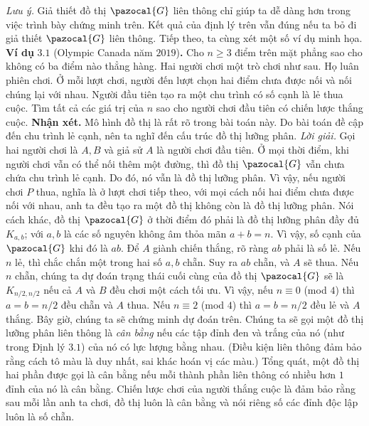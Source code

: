 \begin{multicols}{2}
	\vskip 0.1cm
	\textit{Lưu ý.} Giả thiết đồ thị $\pazocal{G}$ liên thông chỉ giúp ta dễ dàng hơn trong việc trình bày chứng minh trên. Kết quả của định lý trên vẫn đúng nếu ta bỏ đi giả thiết $\pazocal{G}$ liên thông. Tiếp theo, ta cùng xét một số ví dụ minh họa. 
	\vskip 0.1cm
	\textbf{\color{hoccungpi}Ví dụ} $\pmb{3.1}$ (Olympic Canada năm $2019$)\textbf{\color{hoccungpi}.} 
	Cho $n \geq 3$ điểm trên mặt phẳng sao cho không có ba điểm nào thẳng hàng. Hai người chơi một trò chơi như sau. Họ luân phiên chơi. Ở mỗi lượt chơi, người đến lượt chọn hai điểm chưa được nối và nối chúng lại với nhau. Người đầu tiên tạo ra một chu trình có số cạnh là lẻ thua cuộc. Tìm tất cả các giá trị của $n$ sao cho người chơi đầu tiên có chiến lược thắng cuộc.  
	\vskip 0.1cm
	\textbf{\color{hoccungpi}Nhận xét. } Mô hình đồ thị là rất rõ trong bài toán này. Do bài toán đề cập đến chu trình lẻ cạnh, nên ta nghĩ đến cấu trúc đồ thị lưỡng phân.  
	\vskip 0.1cm
	\textit{Lời giải.} Gọi hai người chơi là $A, B$ và giả sử $A$ là người chơi đầu tiên.
	\vskip 0.1cm
	Ở mọi thời điểm, khi người chơi vẫn có thể nối thêm một đường, thì đồ thị $\pazocal{G}$ vẫn chưa chứa chu trình lẻ cạnh. Do đó, nó vẫn là đồ thị lưỡng phân. Vì vậy, nếu người chơi $P$ thua, nghĩa là ở lượt chơi tiếp theo, với mọi cách nối hai điểm chưa được nối với nhau, anh ta đều tạo ra một đồ thị không còn là đồ thị lưỡng phân. Nói cách khác, đồ thị $\pazocal{G}$ ở thời điểm đó phải là đồ thị lưỡng phân đầy đủ $K_{a,b}$; với $a,b$ là các số nguyên không âm thỏa mãn $a+b =n$. Vì vậy, số cạnh của $\pazocal{G}$ khi đó là $ab$.
	\vskip 0.1cm
	Để $A$ giành chiến thắng, rõ ràng $ab$ phải là số lẻ. Nếu $n$ lẻ, thì chắc chắn một trong hai số $a,b$ chẵn. Suy ra $ab$ chẵn, và $A$ sẽ thua. 
	\vskip 0.1cm
	Nếu $n$ chẵn, chúng ta dự đoán trạng thái cuối cùng của đồ thị $\pazocal{G}$ sẽ là $K_{n/2,n/2}$ nếu cả $A$ và $B$ đều chơi một cách tối ưu. Vì vậy, nếu $n \equiv 0$ (mod $4$) thì $a=b = n/2$ đều chẵn và $A$ thua. Nếu $n \equiv 2$ (mod $4$) thì $a=b=n/2$ đều lẻ và $A$ thắng. Bây giờ, chúng ta sẽ chứng minh dự đoán trên.
	\vskip 0.1cm
	Chúng ta sẽ gọi một đồ thị lưỡng phân liên thông là {\it cân bằng} nếu các tập đỉnh đen và trắng  của nó (như trong Định lý $3.1$) của nó có lực lượng bằng nhau. (Điều kiện liên thông đảm bảo rằng cách tô màu là duy nhất, sai khác hoán vị các màu.) Tổng quát, một đồ thị hai phần được gọi là cân bằng nếu mỗi thành phần liên thông có nhiều hơn $1$ đỉnh của nó là cân bằng.
	\vskip 0.1cm
	Chiến lược chơi của người thắng cuộc là đảm bảo rằng sau mỗi lần anh ta chơi, đồ thị luôn là cân bằng và nói riêng số các đỉnh độc lập luôn là số chẵn.

\end{multicols}
